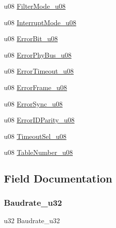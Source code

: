 \begin{DoxyCompactItemize}
\item 
u08 \mbox{\hyperlink{struct_lin___unit_config_type_a769f4ead029acde5af98f370f14b62c8}{Filter\+Mode\+\_\+u08}}
\item 
u08 \mbox{\hyperlink{struct_lin___unit_config_type_ad03f16fd92e0f746355734f819d811e4}{Interrupt\+Mode\+\_\+u08}}
\item 
u08 \mbox{\hyperlink{struct_lin___unit_config_type_afcbe529bcb9e9298393d6d90056cfc0b}{Error\+Bit\+\_\+u08}}
\item 
u08 \mbox{\hyperlink{struct_lin___unit_config_type_accc0a1cb7164d0b044af468265cb66d5}{Error\+Phy\+Bus\+\_\+u08}}
\item 
u08 \mbox{\hyperlink{struct_lin___unit_config_type_a0c0104233e869a60a14d8d05b4b95b5a}{Error\+Timeout\+\_\+u08}}
\item 
u08 \mbox{\hyperlink{struct_lin___unit_config_type_a24e3a16bd6f39b6f4c2c042d9f2cb402}{Error\+Frame\+\_\+u08}}
\item 
u08 \mbox{\hyperlink{struct_lin___unit_config_type_a7163cfbdab06d787d8a09a6e632386e0}{Error\+Sync\+\_\+u08}}
\item 
u08 \mbox{\hyperlink{struct_lin___unit_config_type_a6b8925e8f5f3bda8578f0dfc33758651}{Error\+I\+D\+Parity\+\_\+u08}}
\item 
u08 \mbox{\hyperlink{struct_lin___unit_config_type_ab2a3396279a2d6ceb37ea8ba7d44968e}{Timeout\+Sel\+\_\+u08}}
\item 
u08 \mbox{\hyperlink{struct_lin___unit_config_type_ae9428c28dac36bb72ac32be498636b23}{Table\+Number\+\_\+u08}}
\end{DoxyCompactItemize}


\subsection{Field Documentation}
\mbox{\label{struct_lin___unit_config_type_a1952780932727a7349ef6e6b489f7a28}} 
\subsubsection{\texorpdfstring{Baudrate\+\_\+u32}{Baudrate\_u32}}
{\footnotesize\ttfamily u32 Baudrate\+\_\+u32}

\mbox{\label{struct_lin___unit_config_type_a78aef72c54e48e90425db16c6a3f76dc}} 
